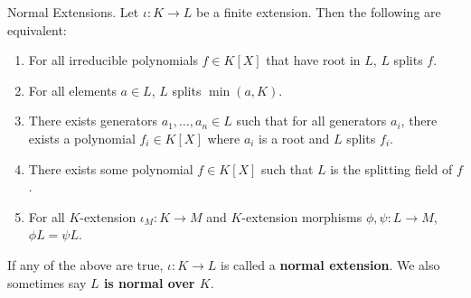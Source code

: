 \documentclass[../book.tex]{subfiles}
\begin{document}
\begin{dfn} Normal Extensions. 
    Let $\iota : K \to L$ be a finite extension. 
    Then the following are equivalent: 
    \begin{enumerate}
        \item For all irreducible polynomials $f \in K[X]$ that have root in $L$,
        $L$ splits $f$. 
        \item For all elements $a \in L$, $L$ splits $\min(a,K)$. 
        \item There exists generators $a_1, \dots, a_n \in L$ such that
        for all generators $a_i$, there exists a polynomial $f_i \in K[X]$
        where $a_i$ is a root and $L$ splits $f_i$.
        \item There exists some polynomial $f \in K[X]$ such that 
        $L$ is the splitting field of $f$. 
        \item For all $K$-extension $\iota_M : K \to M$ and 
        $K$-extension morphisms $\phi, \psi : L \to M$, $\phi L = \psi L$. 
    \end{enumerate}
    If any of the above are true, 
    $\iota : K \to L$ is called a \textbf{normal extension}.
    We also sometimes say \textbf{$L$ is normal over $K$}. 
\end{dfn}
\end{document}
